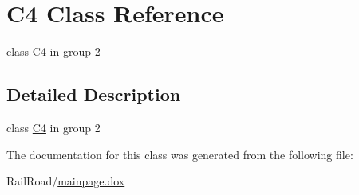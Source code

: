 \hypertarget{class_c4}{\section{C4 Class Reference}
\label{class_c4}
}


class \hyperlink{class_c4}{C4} in group 2  




\subsection{Detailed Description}
class \hyperlink{class_c4}{C4} in group 2 

The documentation for this class was generated from the following file\-:\begin{DoxyCompactItemize}
\item 
Rail\-Road/\hyperlink{mainpage_8dox}{mainpage.\-dox}\end{DoxyCompactItemize}
